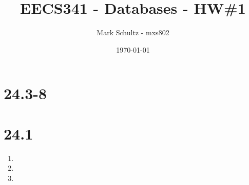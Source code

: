 \documentclass[11pt]{article}
\begin{document}
\title{EECS341 - Databases - HW\#1}
\date{\today}
\author{Mark Schultz - mxs802}
\maketitle
\vspace{.5in}
\section*{24.3-8}
\section*{24.1}
\begin{enumerate}

\item
\item
\item

\end{enumerate}
\end{document}
